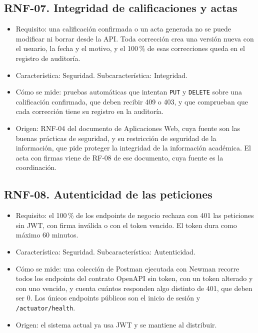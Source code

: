 \subsection*{RNF-07. Integridad de calificaciones y actas}
\begin{itemize}
  \item Requisito: una calificación confirmada o un acta generada no se puede modificar ni borrar desde la API. Toda corrección crea una versión nueva con el usuario, la fecha y el motivo, y el 100\,\% de esas correcciones queda en el registro de auditoría.
  \item Característica: Seguridad. Subcaracterística: Integridad.
  \item Cómo se mide: pruebas automáticas que intentan \texttt{PUT} y \texttt{DELETE} sobre una calificación confirmada, que deben recibir 409 o 403, y que comprueban que cada corrección tiene su registro en la auditoría.
  \item Origen: RNF-04 del documento de Aplicaciones Web, cuya fuente son las buenas prácticas de seguridad, y su restricción de seguridad de la información, que pide proteger la integridad de la información académica. El acta con firmas viene de RF-08 de ese documento, cuya fuente es la coordinación.
\end{itemize}

\subsection*{RNF-08. Autenticidad de las peticiones}
\begin{itemize}
  \item Requisito: el 100\,\% de los endpoints de negocio rechaza con 401 las peticiones sin JWT, con firma inválida o con el token vencido. El token dura como máximo 60 minutos.
  \item Característica: Seguridad. Subcaracterística: Autenticidad.
  \item Cómo se mide: una colección de Postman ejecutada con Newman recorre todos los endpoints del contrato OpenAPI sin token, con un token alterado y con uno vencido, y cuenta cuántos responden algo distinto de 401, que deben ser 0. Los únicos endpoints públicos son el inicio de sesión y \texttt{/actuator/health}.
  \item Origen: el sistema actual ya usa JWT y se mantiene al distribuir.
\end{itemize}

